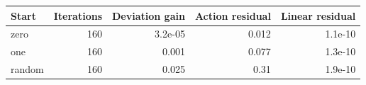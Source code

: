 \begin{tabular}{lrrrr}\toprule
Start & Iterations & Deviation gain & Action residual & Linear residual \\\midrule
zero & 160 & 3.2e-05 & 0.012 & 1.1e-10 \\
one & 160 & 0.001 & 0.077 & 1.3e-10 \\
random & 160 & 0.025 & 0.31 & 1.9e-10 \\
\bottomrule\end{tabular}

